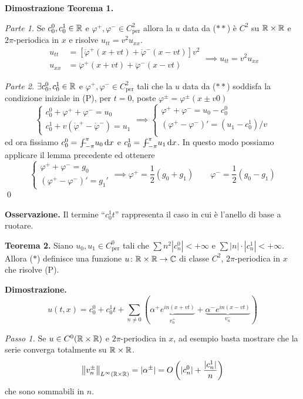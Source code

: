 \textbf{Dimostrazione Teorema 1.}

\textit{Parte 1.}
Se $c_0^0, c_0^1 \in \mathbb R$ e $\varphi^+, \varphi^- \in C^2_\text{per}$ allora la $u$ data da ($**$) è $C^2$ su $\mathbb R \times \mathbb R$ e $2\pi$-periodica in $x$ e risolve $u_{tt} = v^2 u_{xx}$.
$$
\begin{aligned}
	u_{tt} &= [\ddot \varphi^+(x + vt) + \ddot \varphi^-(x - vt)] v^2 \\
	u_{xx} &= \ddot \varphi^+(x + vt) + \ddot \varphi^-(x - vt)
\end{aligned}
\implies u_{tt} = v^2 u_{xx}
$$

\textit{Parte 2.}
$\exists c_0^0, c_0^1 \in \mathbb R$ e $\varphi^+, \varphi^- \in C^2_\text{per}$ tali che la $u$ data da ($**$) soddisfa la condizione iniziale in (P), per $t = 0$, poste $\varphi^\pm = \varphi^\pm(x \pm v0)$
$$
\begin{cases}
	c_0^0 + \varphi^+ + \varphi^- = u_0 \\
	c_0^1 + v(\dot \varphi^+ - \dot \varphi^-) = u_1
\end{cases}
\implies
\begin{cases}
	\varphi^+ + \varphi^- = u_0 - c_0^0 \\
	(\varphi^+ - \varphi^-)' = (u_1 - c_0^1) / v \\
\end{cases}
$$
ed ora fissiamo $c_0^0 = \avint_{-\pi}^\pi u_0 \dd x$ e $c_0^1 = \avint_{-\pi}^\pi u_1 \dd x$. In questo modo possiamo applicare il lemma precedente ed ottenere
$$
\begin{cases}
	\varphi^+ + \varphi^- = g_0 \\
	(\varphi^+ - \varphi^-)' = g_1'
\end{cases}
\implies
\varphi^+ = \frac{1}{2}(g_0 + g_1)
\qquad
\varphi^- = \frac{1}{2}(g_0 - g_1)
$$
\qed

\textbf{Osservazione.}
Il termine ``$c_0^1 t$'' rappresenta il caso in cui è l'anello di base a ruotare.

\textbf{Teorema 2.}
Siano $u_0, u_1 \in C^0_\text{per}$ tali che $\sum n^2 |c_n^0| < +\infty$ e $\sum |n| \cdot |c_n^1| < +\infty$. Allora ($*$) definisce una funzione $u \colon \mathbb R \times \mathbb R \to \mathbb C$ di classe $C^2$, $2\pi$-periodica in $x$ che risolve (P).

\textbf{Dimostrazione.}
$$
u(t,x) = c_0^0 + c_0^1 t + \sum_{n \neq  0} 
(
\underbrace{\alpha^+ e^{in(x + vt)}}_{v^+_n} 
+ 
\underbrace{\alpha^- e^{in(x - vt)}}_{v^-_n}
)
$$

\textit{Passo 1.}
Se $u \in C^0(\mathbb R \times \mathbb R)$ e $2\pi$-periodica in $x$, ad esempio basta mostrare che la serie converga totalmente su $\mathbb R \times \mathbb R$.
$$
\left\lVert v^\pm_n \right\rVert_{L^\infty(\mathbb R \times \mathbb R)} = |\alpha^\pm| = O\left( |c_n^0| + \frac{|c_n^1|}{n} \right)
$$
che sono sommabili in $n$.

